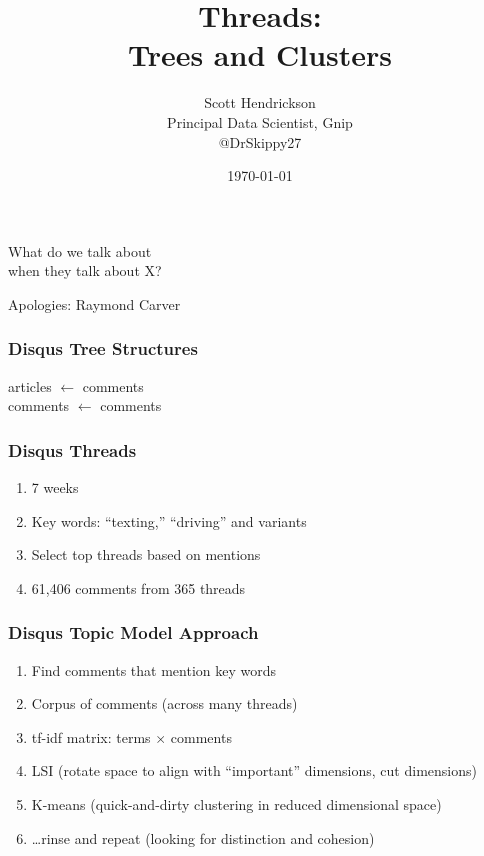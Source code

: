\documentclass{beamer}
\begin{document}
\title{Threads: \\ Trees and Clusters}
\author{Scott Hendrickson \\ Principal Data Scientist, Gnip \\  @DrSkippy27}
\date{\today} 


\begin{frame}
\titlepage
\end{frame}


\begin{frame}
\begin{center}
{\Huge What do we talk about \\ [15pt] when they talk about X?} 
\end{center}
\hfill Apologies: Raymond Carver \\
\end{frame}

\begin{frame}\frametitle{Disqus Tree Structures}
\begin{center}
{\Huge articles $\leftarrow$ comments \\ [20 pt] comments $\leftarrow$ comments}
\end{center}
\end{frame}

\begin{frame}\frametitle{Disqus Threads}
\begin{center}
{\Large 
\begin{enumerate}
\item 7 weeks
\item Key words: ``texting,'' ``driving'' and variants
\item Select top threads based on mentions
\item 61,406 comments from 365 threads
\end{enumerate}
}
\end{center}
\end{frame}

\begin{frame}\frametitle{Disqus Topic Model Approach}
\begin{center}
{\Large 
\begin{enumerate}
\item Find comments that mention key words
\item Corpus of comments (across many threads)
\item tf-idf matrix: terms $\times$ comments
\item LSI (rotate space to align with ``important'' dimensions, cut dimensions)
\item K-means (quick-and-dirty clustering in reduced dimensional space)
\item \ldots rinse and repeat (looking for distinction and cohesion)
\end{enumerate}
}
\end{center}
\end{frame}
\end{document}
